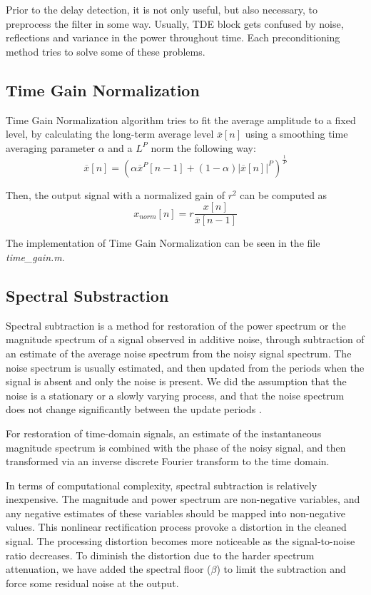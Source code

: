 Prior to the delay detection, it is not only useful, but also necessary, to preprocess the filter in some way. Usually, TDE block gets confused by noise, reflections and variance in the power throughout time. Each preconditioning method tries to solve some of these problems.
\subsection{Time Gain Normalization}
  Time Gain Normalization algorithm tries to fit the average amplitude to a fixed level, by calculating the long-term average level $\overline{x}[n]$ using a smoothing time averaging parameter $\alpha$ and a $L^P$ norm the following way:
  \begin{dmath}
    \overline{x}[n] = (\alpha \overline{x}^P[n-1] + (1-\alpha) |\overline{x}[n]|^P ) ^{\frac{1}{P}}
  \end{dmath}
  
  Then, the output signal with a normalized gain of $r^2$ can be computed as
  \begin{dmath}
    x_{norm}[n] = r \frac{x[n]}{\overline{x}[n-1]}
  \end{dmath}
  
  The implementation of Time Gain Normalization can be seen in the file \emph{time\_gain.m}\cite{timegain.m}.
  
\subsection{Spectral Substraction}
  Spectral subtraction is a method for restoration of the power spectrum or the magnitude spectrum of a signal observed in additive noise, through subtraction of an estimate of the average noise spectrum from the noisy signal spectrum. The noise spectrum is usually estimated, and then updated from the periods when the signal is absent and only the noise is present. We did the assumption that the noise is a stationary or a slowly varying process, and that the noise spectrum does not change significantly between the update periods \cite{speech}. 

  For restoration of time-domain signals, an estimate of the instantaneous magnitude spectrum is combined with the phase of the noisy signal, and then transformed via an inverse discrete Fourier transform to the time domain. 

  In terms of computational complexity, spectral subtraction is relatively inexpensive. The magnitude and power spectrum are non-negative variables, and any negative estimates of these variables should be mapped into non-negative values. This nonlinear rectification process provoke a distortion in the cleaned signal. The processing distortion becomes more noticeable as the signal-to-noise ratio decreases. To diminish the distortion due to the harder spectrum attenuation, we have added the spectral floor ($\beta$) to limit the subtraction and force some residual noise at the output.
  
